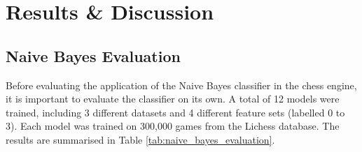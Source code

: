 \chapter{Results \& Discussion}


\section{Naive Bayes Evaluation}

Before evaluating the application of the Naive Bayes classifier in the chess engine, it is important to evaluate the classifier on its own. A total of 12 models were trained, including 3 different datasets and 4 different feature sets (labelled 0 to 3). Each model was trained on 300,000 games from the Lichess database. The results are summarised in Table \ref{tab:naive_bayes_evaluation}.



